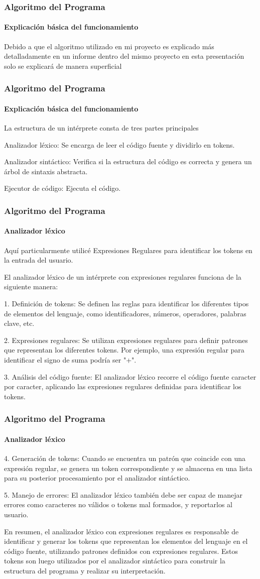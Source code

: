 \documentclass{beamer}
\begin{document}
\begin{frame}
\frametitle{Algoritmo del Programa}
\framesubtitle{Explicación básica del funcionamiento}
Debido a que el algoritmo utilizado en mi proyecto es explicado más detalladamente en un informe dentro del mismo proyecto en esta presentación solo se explicará de manera superficial
\end{frame}

\begin{frame}
\frametitle{Algoritmo del Programa}
\framesubtitle{Explicación básica del funcionamiento}
La estructura de un intérprete consta de tres partes principales


Analizador léxico: Se encarga de leer el código fuente y dividirlo en tokens.


Analizador sintáctico: Verifica si la estructura del código es correcta y genera un árbol de sintaxis abstracta.


Ejecutor de código: Ejecuta el código.
\end{frame}

\begin{frame}
\frametitle{Algoritmo del Programa}
\framesubtitle{Analizador léxico}

Aquí particularmente utilicé Expresiones Regulares para identificar los tokens en la entrada del usuario.

El analizador léxico de un intérprete con expresiones regulares funciona de la siguiente manera:

1. Definición de tokens: Se definen las reglas para identificar los diferentes tipos de elementos del lenguaje, como identificadores, números, operadores, palabras clave, etc.

2. Expresiones regulares: Se utilizan expresiones regulares para definir patrones que representan los diferentes tokens. Por ejemplo, una expresión regular para identificar el signo de suma podría ser "+".

3. Análisis del código fuente: El analizador léxico recorre el código fuente caracter por caracter, aplicando las expresiones regulares definidas para identificar los tokens.

\end{frame}

\begin{frame}
\frametitle{Algoritmo del Programa}
\framesubtitle{Analizador léxico}
4. Generación de tokens: Cuando se encuentra un patrón que coincide con una expresión regular, se genera un token correspondiente y se almacena en una lista para su posterior procesamiento por el analizador sintáctico.

5. Manejo de errores: El analizador léxico también debe ser capaz de manejar errores como caracteres no válidos o tokens mal formados, y reportarlos al usuario.

En resumen, el analizador léxico con expresiones regulares es responsable de identificar y generar los tokens que representan los elementos del lenguaje en el código fuente, utilizando patrones definidos con expresiones regulares. Estos tokens son luego utilizados por el analizador sintáctico para construir la estructura del programa y realizar su interpretación.

\end{frame}
\end{document}
